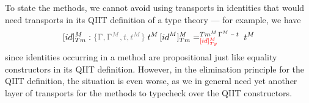 \documentclass[a4paper,UKenglish,numberwithinsect,cleveref,thm-restate]{lipics-v2021}
\begin{document}
\begin{remark}
  To state the methods, we cannot avoid using transports in identities that would need transports in its QIIT definition of a type theory --- for example, we have
  \[
    [\idS]_{\Tm}^M : \implicit{\Gamma, \Gamma^M, t, t^M} \;\subTmM{t^M}{\idS^M} =^{\Tm^M\,\Gamma^M\,\blank\,t}_{\alert{[\idS]^M_{\Ty}}} \; t^M
  \]
  since identities occurring in a method %
  are propositional just like equality constructors in its QIIT definition.
  However, in the elimination principle for the QIIT definition, the situation is even worse, as we in general need yet another layer of transports for the methods to typecheck over the QIIT constructors.

\end{remark}
\end{document}
